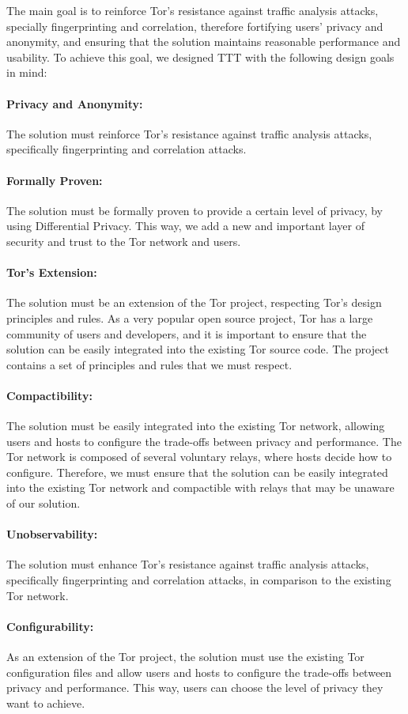 The main goal is to reinforce Tor's resistance against traffic analysis attacks, specially fingerprinting and correlation, therefore fortifying users' privacy and anonymity, and ensuring that the solution maintains reasonable performance and usability. To achieve this goal, we designed TTT with the following design goals in mind:
\paragraph{Privacy and Anonymity:} The solution must reinforce Tor's resistance against traffic analysis attacks, specifically fingerprinting and correlation attacks. 
\paragraph{Formally Proven:} The solution must be formally proven to provide a certain level of privacy, by using Differential Privacy. This way, we add a new and important layer of security and trust to the Tor network and users.
\paragraph{Tor's Extension:} The solution must be an extension of the Tor project, respecting Tor's design principles and rules. As a very popular open source project, Tor has a large community of users and developers, and it is important to ensure that the solution can be easily integrated into the existing Tor source code. The project contains a set of principles and rules that we must respect.
\paragraph{Compactibility:} The solution must be easily integrated into the existing Tor network, allowing users and hosts to configure the trade-offs between privacy and performance. The Tor network is composed of several voluntary relays, where hosts decide how to configure. Therefore, we must ensure that the solution can be easily integrated into the existing Tor network and compactible with relays that may be unaware of our solution.
\paragraph{Unobservability:} The solution must enhance Tor's resistance against traffic analysis attacks, specifically fingerprinting and correlation attacks, in comparison to the existing Tor network. 
\paragraph{Configurability:} As an extension of the Tor project, the solution must use the existing Tor configuration files and allow users and hosts to configure the trade-offs between privacy and performance. This way, users can choose the level of privacy they want to achieve.
